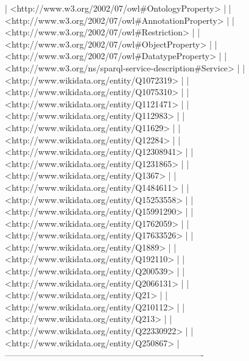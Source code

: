 \documentclass[a4paper, 12pt]{report}
\begin{document}
\begin{messageshell}
| <http://www.w3.org/2002/07/owl#OntologyProperty>                   |
| <http://www.w3.org/2002/07/owl#AnnotationProperty>                 |
| <http://www.w3.org/2002/07/owl#Restriction>                        |
| <http://www.w3.org/2002/07/owl#ObjectProperty>                     |
| <http://www.w3.org/2002/07/owl#DatatypeProperty>                   |
| <http://www.w3.org/ns/sparql-service-description#Service>          |
| <http://www.wikidata.org/entity/Q1072319>                          |
| <http://www.wikidata.org/entity/Q1075310>                          |
| <http://www.wikidata.org/entity/Q1121471>                          |
| <http://www.wikidata.org/entity/Q112983>                           |
| <http://www.wikidata.org/entity/Q11629>                            |
| <http://www.wikidata.org/entity/Q12284>                            |
| <http://www.wikidata.org/entity/Q12308941>                         |
| <http://www.wikidata.org/entity/Q1231865>                          |
| <http://www.wikidata.org/entity/Q1367>                             |
| <http://www.wikidata.org/entity/Q1484611>                          |
| <http://www.wikidata.org/entity/Q15253558>                         |
| <http://www.wikidata.org/entity/Q15991290>                         |
| <http://www.wikidata.org/entity/Q1762059>                          |
| <http://www.wikidata.org/entity/Q17633526>                         |
| <http://www.wikidata.org/entity/Q1889>                             |
| <http://www.wikidata.org/entity/Q192110>                           |
| <http://www.wikidata.org/entity/Q200539>                           |
| <http://www.wikidata.org/entity/Q2066131>                          |
| <http://www.wikidata.org/entity/Q21>                               |
| <http://www.wikidata.org/entity/Q210112>                           |
| <http://www.wikidata.org/entity/Q213>                              |
| <http://www.wikidata.org/entity/Q22330922>                         |
| <http://www.wikidata.org/entity/Q250867>                           |
----------------------------------------------------------------------
\end{messageshell}
\end{document}
